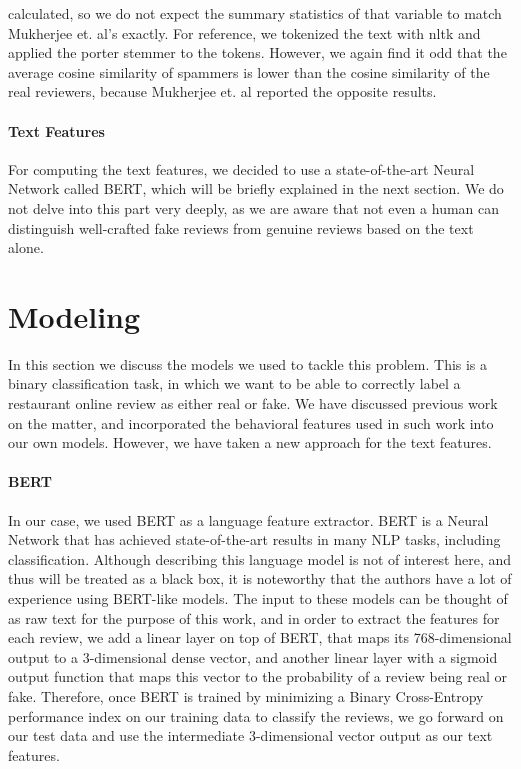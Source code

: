 \documentclass[man, floatsintext, 10pt]{apa6}
\begin{document}
calculated, so we do not expect the summary statistics of that variable to match Mukherjee et. al's exactly. For reference, we tokenized the text with nltk and applied the porter stemmer to the tokens. However, we again find it odd that the average cosine similarity of spammers is lower than the cosine similarity  of the real reviewers, because Mukherjee et. al reported the opposite results.
 \vspace{2mm}
 
\paragraph{Text Features} For computing the text features, we decided to use a state-of-the-art Neural Network called BERT, which will be briefly explained in the next section. We do not delve into this part very deeply, as we are aware that not even a human can distinguish well-crafted fake reviews from genuine reviews based on the text alone.


\section{Modeling}

In this section we discuss the models we used to tackle this problem. This is a binary classification task, in which we want to be able to correctly label a restaurant online review as either real or fake. We have discussed previous work on the matter, and incorporated the behavioral features used in such work into our own models. However, we have taken a new approach for the text features.

\vspace{2mm}

\paragraph{BERT} In our case, we used BERT as a language feature extractor. BERT is a Neural Network that has achieved state-of-the-art results in many NLP tasks, including classification. Although describing this language model is not of interest here, and thus will be treated as a black box, it is noteworthy that the authors have a lot of experience using BERT-like models. The input to these models can be thought of as raw text for the purpose of this work, and in order to extract the features for each review, we add a linear layer on top of BERT, that maps its 768-dimensional output to a 3-dimensional dense vector, and another linear layer with a sigmoid output function that maps this vector to the probability of a review being real or fake. Therefore, once BERT is trained by minimizing a Binary Cross-Entropy performance index on our training data to classify the reviews, we go forward on our test data and use the intermediate 3-dimensional vector output as our text features. 
\end{document}
